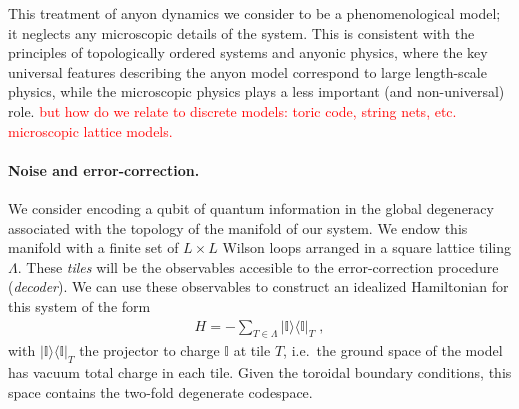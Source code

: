 \documentclass[aps, prl, letterpaper, twocolumn, superscriptaddress, notitlepage, 10pt]{revtex4-1}
\newcommand{\vac}{\mathbb{I}}
\newcommand{\ket}[1]{|{#1}\rangle}
\newcommand{\bra}[1]{\langle{#1}|}
\newcommand{\ketbra}[2]{\ket{#1}\!\bra{#2}}
\newcommand{\proj}[1]{\ketbra{#1}{#1}}
\newcommand{\dude}[1]{\textcolor{red}{#1}}
\begin{document}
This treatment of anyon dynamics we consider to be a phenomenological model;
it neglects any microscopic details of the system.
This is consistent with the principles of topologically 
ordered systems and anyonic physics, where the key universal features describing the 
anyon model correspond to large length-scale physics, while the microscopic physics plays 
a less important (and non-universal) role.
\dude{but how do we relate to discrete models: toric code, string nets, etc.
microscopic lattice models.}

\paragraph{Noise and error-correction.}


We consider encoding a qubit of quantum information in the global degeneracy associated 
with the topology of the manifold of our system.
We endow this manifold with a finite set of $L\times L$ Wilson loops arranged in
a square lattice tiling $\Lambda$.
These \emph{tiles} will be the observables accesible to the error-correction procedure (\emph{decoder}).
We can use these observables to construct an idealized Hamiltonian for this system of the form
\begin{align}
	H=-\sum_{T\in \Lambda}\proj{\vac}_T\;,\label{e:hamiltonian}
\end{align}
with $\proj{\vac}_T$ the projector to charge $\vac$ at tile $T$, i.e.~the ground 
space of the model has vacuum total charge in each tile.
Given the toroidal boundary 
conditions, this space contains the two-fold degenerate codespace.
\end{document}
